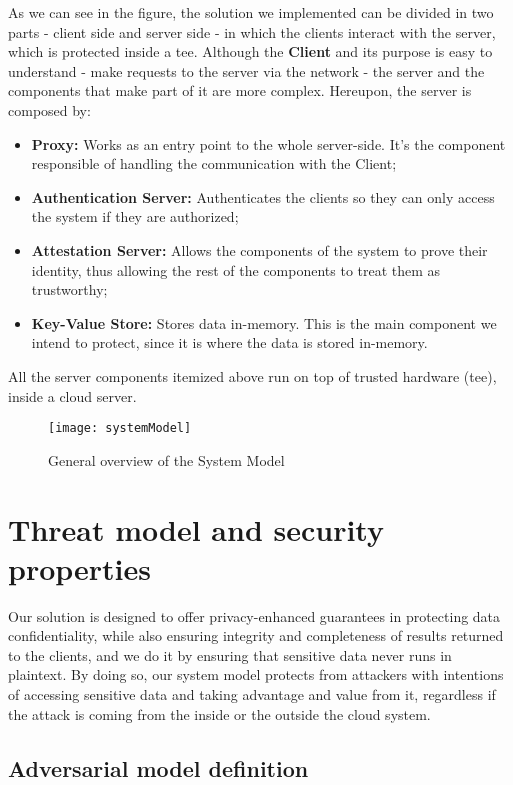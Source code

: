 As we can see in the figure, the solution we implemented can be divided in two parts - client side and server side - in which the clients interact with the server, which is protected inside a \gls{tee}. Although the \textbf{Client} and its purpose is easy to understand - make requests to the server via the network - the server and the components that make part of it are more complex. Hereupon, the server is composed by: 
\begin{itemize}
	\item \textbf{Proxy:} Works as an entry point to the whole server-side. It's the component responsible of handling the communication with the Client;
	\item \textbf{Authentication Server:} Authenticates the clients so they can only access the system if they are authorized;
	\item \textbf{Attestation Server:} Allows the components of the system to prove their identity, thus allowing the rest of the components to treat them as trustworthy;
	\item \textbf{Key-Value Store:} Stores data in-memory. This is the main component we intend to protect, since it is where the data is stored in-memory.
\end{itemize} 


All the server components itemized above run on top of trusted hardware (\gls{tee}), inside a cloud server.

\begin{figure}[htbp]
	\centering
	{\texttt{[image: systemModel]}}
	\caption{General overview of the System Model}
	\label{fig:systemModel}
\end{figure}


\section{Threat model and security properties} %
\label{sec:threatModel_and_securityProperties}

Our solution is designed to offer privacy-enhanced guarantees in protecting data confidentiality, while also ensuring integrity and completeness of results returned to the clients, and we do it by ensuring that sensitive data never runs in plaintext. 
By doing so, our system model protects from attackers with intentions of accessing sensitive data and taking advantage and value from it, regardless if the attack is coming from the inside or the outside the cloud system.


\subsection{Adversarial model definition}

